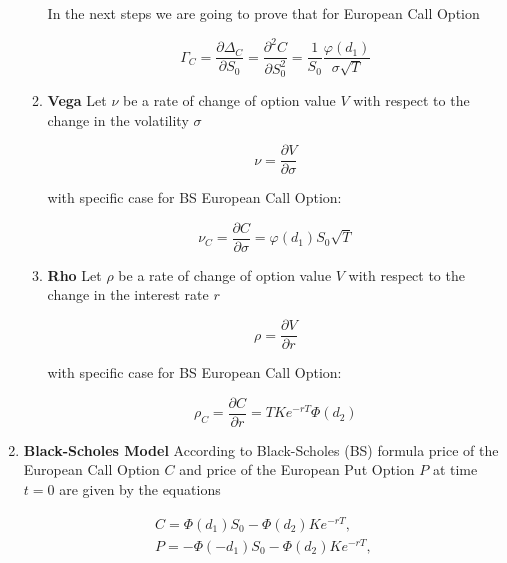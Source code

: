 \documentclass[12pt]{article}
\begin{document}
\begin{enumerate}[leftmargin=\labelsep]
\begin{enumerate}
    In the next steps we are going to prove that for European Call Option
    
    \begin{equation}
        \Gamma_C = \frac{\partial \Delta_C}{\partial S_0}  =
        \frac{\partial^2 C}{\partial S_0^2} =
        \frac{1}{S_0}\frac{\varphi(d_1)}{\sigma  \sqrt{T}}
    \end{equation}

    \item \textbf{Vega} Let $\nu$ be a rate of change of option value $V$ with respect to the change in the volatility $\sigma$

    \begin{equation}
        \nu = \frac{\partial V}{\partial \sigma}
    \end{equation}

    with specific case for BS European Call Option:

    \begin{equation}\label{vega_c}
        \nu_C = \frac{\partial C}{\partial \sigma} = \varphi(d_1) S_0 \sqrt{T} 
    \end{equation}

    \item \textbf{Rho} Let $\rho$ be a rate of change of option value $V$ with respect to the change in the interest rate $r$

    \begin{equation}
        \rho = \frac{\partial V}{\partial r}
    \end{equation}

    with specific case for BS European Call Option:

    \begin{equation}\label{rho_c}
        \rho_C = \frac{\partial C}{\partial r} 
        = T K e^{-rT} \Phi(d_2)
    \end{equation}

    
    
\end{enumerate}




\item \textbf{Black-Scholes Model} According to Black-Scholes (BS) formula price of the European Call Option $C$ and price of the European Put Option $P$ at time $t = 0$ are given by the equations \cite{davis2010black}


\begin{align}\label{pc}
     C = \Phi(d_1)S_0 - \Phi(d_2)Ke^{-rT},\\
     P = -\Phi(-d_1)S_0 - \Phi(d_2)Ke^{-rT},
\end{align}


\end{enumerate}
\end{document}

